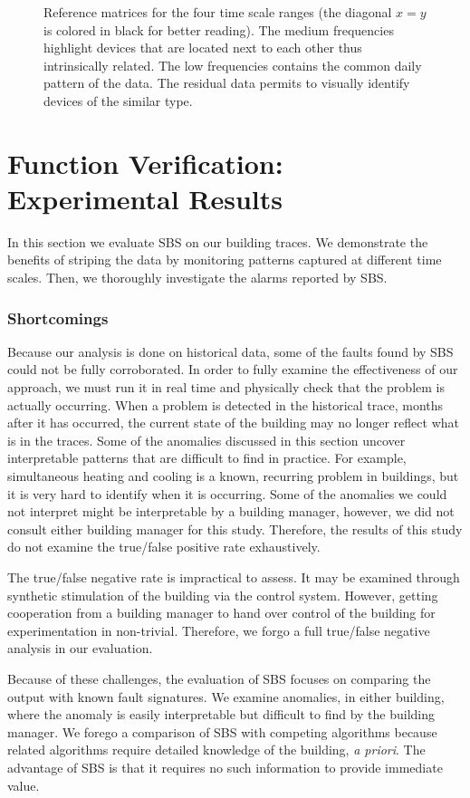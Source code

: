 \begin{figure}[t!]
\caption{Reference matrices for the four time scale ranges (the diagonal $x=y$ is colored in black for better reading). The medium frequencies highlight devices that are located next to each other thus intrinsically related. The low frequencies contains the common daily pattern of the data. The residual data permits to visually identify devices of the similar type.}
\label{fig:heatmap}
\end{figure}

\section{Function Verification: Experimental Results}
\label{eval}
In this section we evaluate SBS on our building traces.  We demonstrate
 the benefits of striping the data by monitoring patterns captured at different time scales.
Then, we thoroughly investigate the alarms reported by SBS.  

\subsubsection{Shortcomings}
Because our analysis is done on historical data, some of the faults found by SBS could not be fully
corroborated.  In order to fully examine the effectiveness of our approach, we must run it in real time and
physically check that the problem is actually occurring.  When a problem is detected
in the historical trace, months after it has occurred, the current state of the building may no longer reflect
what is in the traces.  Some of the anomalies discussed in this section uncover interpretable patterns 
that are difficult to find in practice.  For example, simultaneous heating and cooling is a known, recurring problem
 in buildings, but it is very hard to identify  when it is occurring.  Some of the anomalies we could not interpret
might be interpretable by a building manager, however, we did not consult either building manager for this study.
Therefore, the results of this study do not examine the true/false positive rate exhaustively.

The true/false negative rate is impractical to assess.  It may be examined through synthetic stimulation of
the building via the control system.  However, getting cooperation from a building manager to hand over control of the building
for experimentation in non-trivial.  Therefore, we forgo a full true/false negative analysis in our evaluation.

Because of these challenges, the evaluation of SBS focuses on comparing the output with known fault
signatures.  We examine anomalies, in either building, where the anomaly is easily interpretable but
difficult to find by the building manager.  We forego a comparison of SBS with competing algorithms because
 related algorithms require detailed knowledge of the building, \emph{a priori}.  The advantage of SBS is that it 
requires no such information to provide immediate value.

